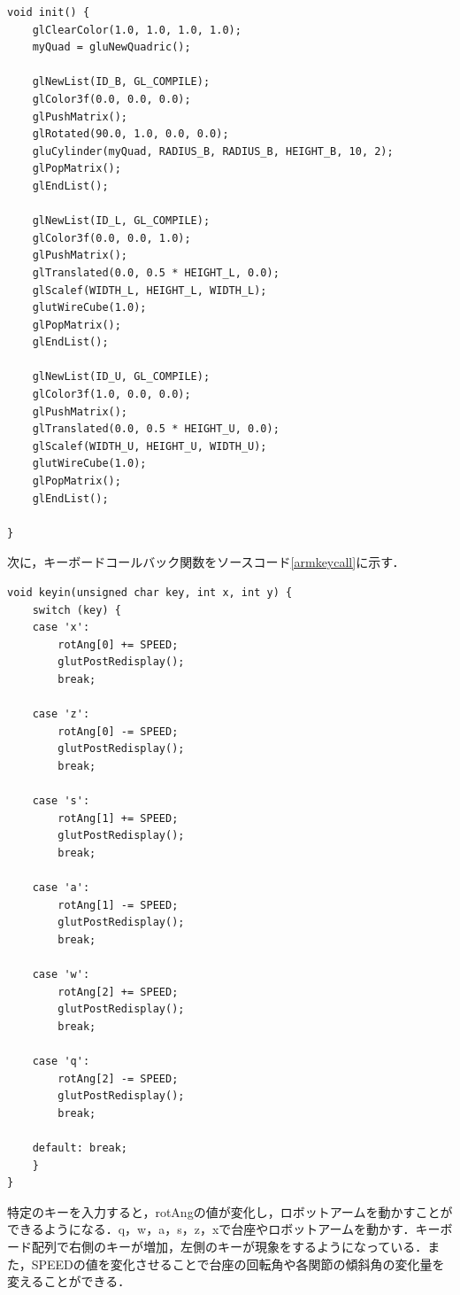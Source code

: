 \documentclass[]{jsarticle}
\begin{document}
\begin{lstlisting}[caption=ロボットアームの情報,label=armtouroku]
void init() {
    glClearColor(1.0, 1.0, 1.0, 1.0);
    myQuad = gluNewQuadric();

    glNewList(ID_B, GL_COMPILE);
    glColor3f(0.0, 0.0, 0.0);
    glPushMatrix();
    glRotated(90.0, 1.0, 0.0, 0.0);
    gluCylinder(myQuad, RADIUS_B, RADIUS_B, HEIGHT_B, 10, 2);
    glPopMatrix();
    glEndList();

    glNewList(ID_L, GL_COMPILE);
    glColor3f(0.0, 0.0, 1.0);
    glPushMatrix();
    glTranslated(0.0, 0.5 * HEIGHT_L, 0.0);
    glScalef(WIDTH_L, HEIGHT_L, WIDTH_L);
    glutWireCube(1.0);
    glPopMatrix();
    glEndList();

    glNewList(ID_U, GL_COMPILE);
    glColor3f(1.0, 0.0, 0.0);
    glPushMatrix();
    glTranslated(0.0, 0.5 * HEIGHT_U, 0.0);
    glScalef(WIDTH_U, HEIGHT_U, WIDTH_U);
    glutWireCube(1.0);
    glPopMatrix();
    glEndList();

}
\end{lstlisting}

次に，キーボードコールバック関数をソースコード\ref{armkeycall}に示す．
\begin{lstlisting}[caption=キーボードコールバック関数,label=armkeycall]
void keyin(unsigned char key, int x, int y) {
    switch (key) {
    case 'x':
        rotAng[0] += SPEED;
        glutPostRedisplay();
        break;

    case 'z':
        rotAng[0] -= SPEED;
        glutPostRedisplay();
        break;

    case 's':
        rotAng[1] += SPEED;
        glutPostRedisplay();
        break;

    case 'a':
        rotAng[1] -= SPEED;
        glutPostRedisplay();
        break;

    case 'w':
        rotAng[2] += SPEED;
        glutPostRedisplay();
        break;

    case 'q':
        rotAng[2] -= SPEED;
        glutPostRedisplay();
        break;

    default: break;
    }
}
\end{lstlisting}

特定のキーを入力すると，rotAngの値が変化し，ロボットアームを動かすことができるようになる．q，w，a，s，z，xで台座やロボットアームを動かす．キーボード配列で右側のキーが増加，左側のキーが現象をするようになっている．また，SPEEDの値を変化させることで台座の回転角や各関節の傾斜角の変化量を変えることができる．
\end{document}
